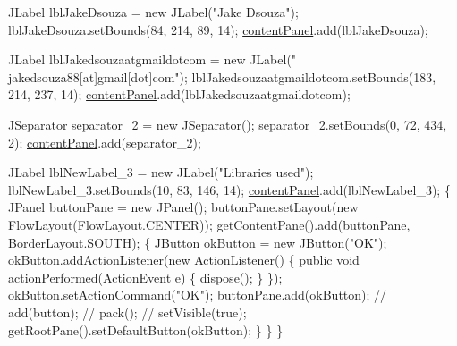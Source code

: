 \begin{DoxyCode}
        JLabel lblJakeDsouza = \textcolor{keyword}{new} JLabel(\textcolor{stringliteral}{"Jake Dsouza"});
        lblJakeDsouza.setBounds(84, 214, 89, 14);
        \hyperlink{classcom_1_1poly_1_1nlp_1_1filekommander_1_1views_1_1_about_file_kommander_ad925c308e870c6d3789d72cdec139c93}{contentPanel}.add(lblJakeDsouza);
        
        JLabel lblJakedsouzaatgmaildotcom = \textcolor{keyword}{new} JLabel(\textcolor{stringliteral}{"
      jakedsouza88[at]gmail[dot]com"});
        lblJakedsouzaatgmaildotcom.setBounds(183, 214, 237, 14);
        \hyperlink{classcom_1_1poly_1_1nlp_1_1filekommander_1_1views_1_1_about_file_kommander_ad925c308e870c6d3789d72cdec139c93}{contentPanel}.add(lblJakedsouzaatgmaildotcom);
        
        JSeparator separator\_2 = \textcolor{keyword}{new} JSeparator();
        separator\_2.setBounds(0, 72, 434, 2);
        \hyperlink{classcom_1_1poly_1_1nlp_1_1filekommander_1_1views_1_1_about_file_kommander_ad925c308e870c6d3789d72cdec139c93}{contentPanel}.add(separator\_2);
        
        JLabel lblNewLabel\_3 = \textcolor{keyword}{new} JLabel(\textcolor{stringliteral}{"Libraries used"});
        lblNewLabel\_3.setBounds(10, 83, 146, 14);
        \hyperlink{classcom_1_1poly_1_1nlp_1_1filekommander_1_1views_1_1_about_file_kommander_ad925c308e870c6d3789d72cdec139c93}{contentPanel}.add(lblNewLabel\_3);
        \{
            JPanel buttonPane = \textcolor{keyword}{new} JPanel();
            buttonPane.setLayout(\textcolor{keyword}{new} FlowLayout(FlowLayout.CENTER));
            getContentPane().add(buttonPane, BorderLayout.SOUTH);
            \{
                JButton okButton = \textcolor{keyword}{new} JButton(\textcolor{stringliteral}{"OK"});
                okButton.addActionListener(\textcolor{keyword}{new} ActionListener() \{
                    \textcolor{keyword}{public} \textcolor{keywordtype}{void} actionPerformed(ActionEvent e) \{
                    dispose();
                    \}
                \});
                okButton.setActionCommand(\textcolor{stringliteral}{"OK"});
                buttonPane.add(okButton);
                \textcolor{comment}{// add(button);}
                \textcolor{comment}{// pack();}
                \textcolor{comment}{// setVisible(true);}
                getRootPane().setDefaultButton(okButton);
            \}
        \}
    \}
\end{DoxyCode}


